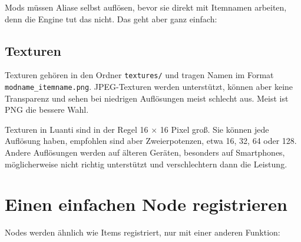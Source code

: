 Mods müssen Aliase selbst auflösen, bevor sie direkt mit Itemnamen
arbeiten, denn die Engine tut das nicht. Das geht aber ganz einfach:

\begin{Shaded}
\begin{Highlighting}[]
 \OperatorTok{=} \OperatorTok{[}\OperatorTok{]}  
\end{Highlighting}
\end{Shaded}

\subsection{Texturen}\label{texturen}

Texturen gehören in den Ordner
\texttt{textures/\allowbreak{}} und tragen Namen im Format
\texttt{modname\_\allowbreak{}itemname.\allowbreak{}png}. JPEG-Texturen
werden unterstützt, können aber keine Transparenz und sehen bei
niedrigen Auflösungen meist schlecht aus. Meist ist PNG die bessere
Wahl.

Texturen in Luanti sind in der Regel 16 × 16 Pixel groß. Sie können jede
Auflösung haben, empfohlen sind aber Zweierpotenzen, etwa 16, 32, 64
oder 128. Andere Auflösungen werden auf älteren Geräten, besonders auf
Smartphones, möglicherweise nicht richtig unterstützt und verschlechtern
dann die Leistung.

\section{Einen einfachen Node
registrieren}\label{einen-einfachen-node-registrieren}

Nodes werden ähnlich wie Items registriert, nur mit einer anderen
Funktion:

\begin{Shaded}
\begin{Highlighting}[]
\OperatorTok{(}\OperatorTok{,} \OperatorTok{\{}
     \OperatorTok{=} \OperatorTok{,}
     \OperatorTok{=} \OperatorTok{\{}  \OperatorTok{\},}
     \OperatorTok{=} \OperatorTok{,}
     \OperatorTok{=} \OperatorTok{\{}  \OperatorTok{=} \OperatorTok{,}  \OperatorTok{=}  \OperatorTok{\},}
\OperatorTok{\})}
\end{Highlighting}
\end{Shaded}

